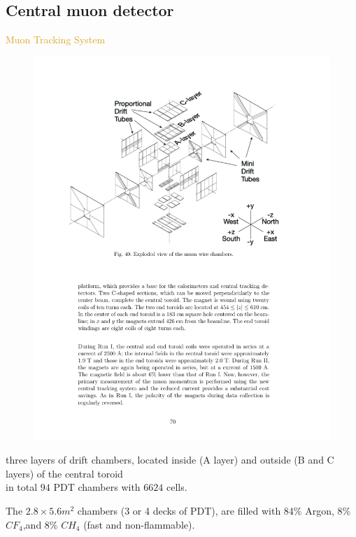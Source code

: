 \subsection{Central muon detector}
\begin{frame}{\textcolor{Goldenrod}{Muon Tracking System}}
  \begin{overlayarea}{\textwidth}{\textheight}
    \begin{figure}[h]
      \centering
      \includegraphics[height=0.4\textheight]{./Images/43_MD_PDT.pdf}
    \end{figure}
    {\small
    \itt
  \item 
    three layers of drift chambers, located inside (A layer)
    and outside (B and C layers) of the central toroid\\
    in total $94$ PDT chambers with $6624$ cells.
    
  \item
    The $2.8 \times 5.6 m^2$ chambers (3 or 4 decks of PDT), are
    filled with 84\% Argon, 8\% $CF_4$,and 8\% $CH_4$ (fast and
    non-flammable).
    \tti
  }
  \end{overlayarea}
\end{frame}

